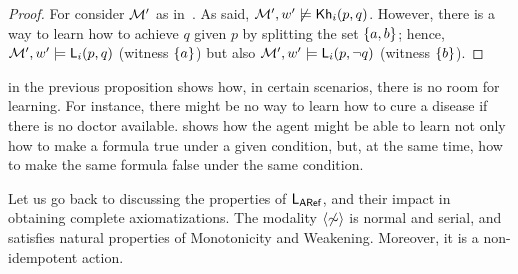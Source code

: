\begin{proof}
For  consider $\mathcal{M}'$ as in~.
As said, $\mathcal{M}',w'\not\models{\sf Kh}_i(p,q)$.
However, there is a way to learn how to achieve $q$ given $p$ by splitting the set $\{ a,b \}$; hence, $\mathcal{M}',w'\models {\sf L}_i(p,q)$ (witness $\{ a \}$) but also $\mathcal{M}',w'\models{\sf L}_i(p,\neg q)$ (witness $\{ b \}$).
\end{proof}

 in the previous proposition shows how, in certain scenarios, there is
no room for learning. For instance, there might be no way to learn how
to cure a disease if there is no doctor
available.  shows how the agent might be able
to learn not only how to make a formula true under a given condition,
but, at the same time, how to make the same formula false under the same condition.

\smallskip

Let us go back to discussing the properties of $\mathsf{L_{ARef}}$, and their impact in obtaining complete axiomatizations. The modality $\langle \not\sim \rangle$ is normal and serial, and satisfies  natural properties 
of Monotonicity and Weakening. Moreover, it is a non-idempotent action. 


\medskip 

